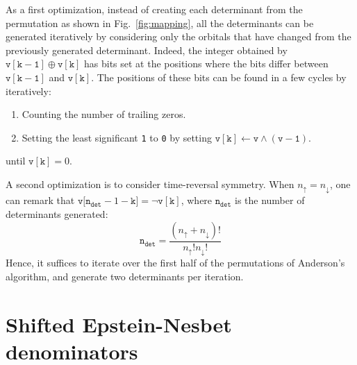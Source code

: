 \documentclass[aip,jcp,reprint,showkeys]{revtex4-1}
\newcommand{\up}{\uparrow}
\newcommand{\dn}{\downarrow}
\newcommand{\one}{{\texttt{1}}}
\newcommand{\zero}{{\texttt{0}}}
\begin{document}
As a first optimization, instead of creating each determinant from the
permutation as shown in Fig.~\ref{fig:mapping}, all the determinants can be 
generated iteratively by considering only the orbitals that have changed
from the previously generated determinant.
Indeed, the integer obtained by $\mathtt{v[k-1]} \oplus \mathtt{v[k]}$ has bits set at the positions where the bits differ between $\mathtt{v[k-1]}$ and
$\mathtt{v[k]}$. The positions of these bits can be found in a few cycles by
iteratively:
\begin{enumerate}
\item Counting the number of trailing zeros.
\item Setting the least significant {\one} to {\zero} by setting
      $\mathtt{v[k] \gets v \wedge (v-1)}$.
\end{enumerate}
until $\mathtt{v[k]} = 0$. 

A second optimization is to consider time-reversal symmetry. When $n_\up =
n_\dn$, one can remark that ${\mathtt{v[n_{det}}-1-\mathtt{k]} = \neg \mathtt{v[k]}}$, 
where $\mathtt{n_{det}}$ is the number of determinants generated:
\begin{equation}
\mathtt{n_{det}} = \frac{(n_\up +n_\dn)!}{n_\up! n_\dn!}
\end{equation}
Hence, it suffices to iterate over the first half of the permutations of Anderson's
algorithm, and generate two determinants per iteration.


\section{Shifted Epstein-Nesbet denominators}
\end{document}
